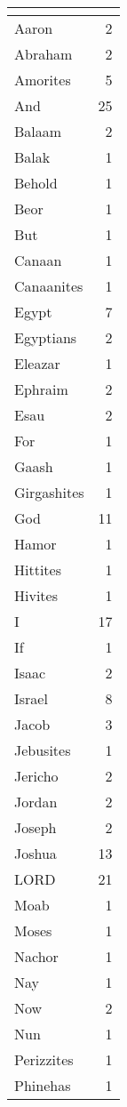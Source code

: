 \begin{center}
\begin{longtable}{l|r}
\hline \multicolumn{2}{c}{{ }} \\ \hline
\endfoot 
Aaron & 2\\ \hline 
Abraham & 2\\ \hline 
Amorites & 5\\ \hline 
And & 25\\ \hline 
Balaam & 2\\ \hline 
Balak & 1\\ \hline 
Behold & 1\\ \hline 
Beor & 1\\ \hline 
But & 1\\ \hline 
Canaan & 1\\ \hline 
Canaanites & 1\\ \hline 
Egypt & 7\\ \hline 
Egyptians & 2\\ \hline 
Eleazar & 1\\ \hline 
Ephraim & 2\\ \hline 
Esau & 2\\ \hline 
For & 1\\ \hline 
Gaash & 1\\ \hline 
Girgashites & 1\\ \hline 
God & 11\\ \hline 
Hamor & 1\\ \hline 
Hittites & 1\\ \hline 
Hivites & 1\\ \hline 
I & 17\\ \hline 
If & 1\\ \hline 
Isaac & 2\\ \hline 
Israel & 8\\ \hline 
Jacob & 3\\ \hline 
Jebusites & 1\\ \hline 
Jericho & 2\\ \hline 
Jordan & 2\\ \hline 
Joseph & 2\\ \hline 
Joshua & 13\\ \hline 
LORD & 21\\ \hline 
Moab & 1\\ \hline 
Moses & 1\\ \hline 
Nachor & 1\\ \hline 
Nay & 1\\ \hline 
Now & 2\\ \hline 
Nun & 1\\ \hline 
Perizzites & 1\\ \hline 
Phinehas & 1\\ \hline 

\end{longtable}
\end{center}
